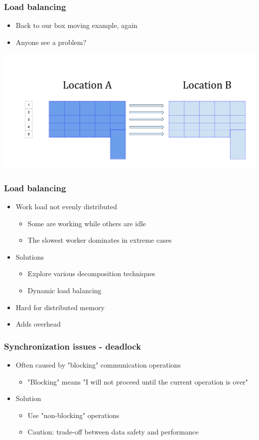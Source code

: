 \documentclass[10pt,t]{beamer}
\begin{document}
\begin{frame}
  \frametitle{Load balancing}
  \begin{itemize}
  \item Back to our box moving example, again
  \item Anyone see a problem?
  \end{itemize}
  \includegraphics[width=\textwidth]{./Load-Balance}
\end{frame}

\begin{frame}
  \frametitle{Load balancing}
  \begin{itemize}
  \item Work load not evenly distributed
    \begin{itemize}
    \item Some are working while others are idle
    \item The slowest worker dominates in extreme cases
    \end{itemize}
  \item Solutions
    \begin{itemize}
    \item Explore various decomposition techniques
    \item Dynamic load balancing
    \end{itemize}
  \item Hard for distributed memory
  \item Adds overhead
  \end{itemize}
\end{frame}

\begin{frame}
  \frametitle{Synchronization issues - deadlock}
  \begin{itemize}
  \item Often caused by "blocking" communication operations
    \begin{itemize}
    \item "Blocking" means "I will not proceed until the current operation is over"
    \end{itemize}
  \item Solution
    \begin{itemize}
    \item Use "non-blocking" operations
    \item Caution: trade-off between data safety and performance
    \end{itemize}
  \end{itemize}
\end{frame}
\end{document}
